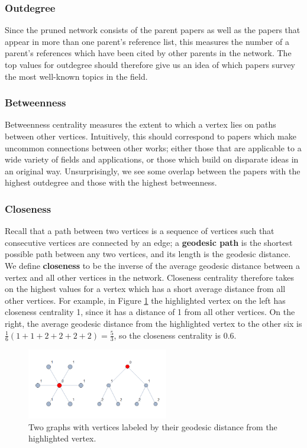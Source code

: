 \documentclass[12pt]{thesis}
\theoremstyle{plain}
\theoremstyle{definition}
\theoremstyle{remark}
\begin{document}
\subsubsection{Outdegree} Since the pruned network consists of the parent papers as well as the papers that appear in more than one parent's reference list, this measures the number of a parent's references which have been cited by other parents in the network. The top values for outdegree should therefore give us an idea of which papers survey the most well-known topics in the field.

\subsubsection{Betweenness} Betweenness centrality measures the extent to which a vertex lies on paths between other vertices. Intuitively, this should correspond to papers which make uncommon connections between other works; either those that are applicable to a wide variety of fields and applications, or those which build on disparate ideas in an original way. Unsurprisingly, we see some overlap between the papers with the highest outdegree and those with the highest betweenness.

\subsubsection{Closeness} 

Recall that a path between two vertices is a sequence of vertices such that consecutive vertices are connected by an edge; a \textbf{geodesic path} is the shortest possible path between any two vertices, and its length is the geodesic distance. We define \textbf{closeness} to be the inverse of the average geodesic distance between a vertex and all other vertices in the network. Closeness centrality therefore takes on the highest values for a vertex which has a short average distance from all other vertices. For example, in Figure \ref{fig:closeness_demo} the highlighted vertex on the left has closeness centrality 1, since it has a distance of 1 from all other vertices. On the right, the average geodesic distance from the highlighted vertex to the other six is $\frac{1}{6}(1+1+2+2+2+2)=\frac{5}{3}$, so the closeness centrality is 0.6.

\begin{figure}
\centering
\vspace{-15pt}
\includegraphics[width=0.55\textwidth]{closeness_demo.png}
\vspace{-10pt}
\caption{Two graphs with vertices labeled by their geodesic distance from the highlighted vertex.}
\vspace{-15pt}
\label{fig:closeness_demo}
\end{figure}
\end{document}
